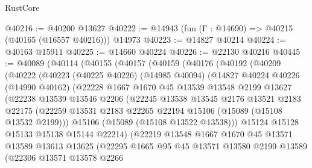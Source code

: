 \begin{lexlean}{RustCore}
\begin{coremodule}
@40216 := @40200 @13627
@40222 := @14943 (fun (Γ : @14690) => @40215 (@40165 (@16557 @40216))) @14973
@40223 := @14827 @40214
@40224 := @40163 @15911
@40225 := @14660 @40224
@40226 := @22130 @40216
@40445 := @40089
    (@40114
      (@40155
        (@40157
          (@40159
            (@40176
              (@40192
                (@40209
                  (@40222
                    (@40223
                      (@40225 @40226)
                      (@14985 @40094)
                      (@14827
                        @40224
                        @40226
                        (@14990 @40162)
                        (@22228
                          @1667
                          @1670
                          @45
                          @13539
                          @13548
                          @2199
                          @13627
                          (@22238
                            @13539
                            @13546
                            @2206
                            (@22245
                              @13538
                              @13545
                              @2176
                              @13521
                              @2183
                              @22175
                              (@22259
                                @13531
                                @2183
                                @22265
                                @22194
                                @15106
                                (@15089 (@15108 @13532 @2199)))
                              @15106
                              (@15089 (@15108 @13522 @13538)))
                            @15124
                            @15128
                            @15133
                            @15138
                            @15144
                            @22214)
                          (@22219
                            @13548
                            @1667
                            @1670
                            @45
                            @13571
                            @13589
                            @13613
                            @13625
                            (@22295
                              @1665
                              @95
                              @45
                              @13571
                              @13580
                              @2199
                              @13589
                              (@22306
                                @13571
                                @13578
                                @2266

\end{coremodule}
\end{lexlean}
